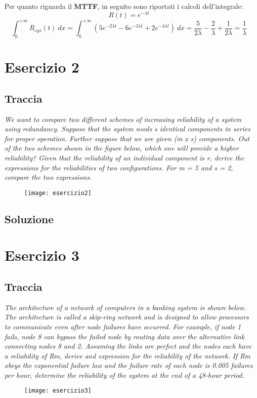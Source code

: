 Per quanto riguarda il \textbf{MTTF}, in seguito sono riportati
i calcoli dell'integrale:
$$R(t) = e^{-\lambda t}$$
$$\int_0^{+\infty} R_{sys}(t)\ dx =
\int_0^{+\infty} (5e^{-2\lambda t}-6e^{-3\lambda t}+2e^{-4\lambda t}) \ dx =
\frac{5}{2\lambda} - \frac{2}{\lambda} + \frac{1}{2\lambda} =
\frac{1}{\lambda}$$

\clearpage

\section{Esercizio 2}
\subsection{Traccia}
\textit{We want to compare two different schemes of increasing reliability of a
system using redundancy. Suppose that the system needs s identical components
in series for proper operation. Further suppose that we are given (m x s)
components. Out of the two schemes shown in the figure below, which one will
provide a higher reliability? Given that the reliability of an individual
component is r, derive the expressions for the reliabilities of two configurations.
For m = 5 and s = 2, compare the two expressions.}

\begin{figure}[!htbp]
  \centering
  \texttt{[image: esercizio2]}
\end{figure}

\clearpage
\subsection{Soluzione}

\clearpage
\section{Esercizio 3}
\subsection{Traccia}
\textit{The architecture of a network of computers in a banking system is shown
below. The architecture is called a skip-ring network and is designed to allow
processors to communicate even after node failures have occurred. For example,
if node 1 fails, node 8 can bypass the failed node by routing data over the
alternative link connecting nodes 8 and 2. Assuming the links are perfect and
the nodes each have a reliability of Rm, derive and expression for the reliability
of the network. If Rm obeys the exponential failure law and the failure rate of
each node is 0.005 failures per hour, determine the reliability of the system
at the end of a 48-hour period.}
\begin{figure}[!htbp]
  \centering
  \texttt{[image: esercizio3]}
\end{figure}

